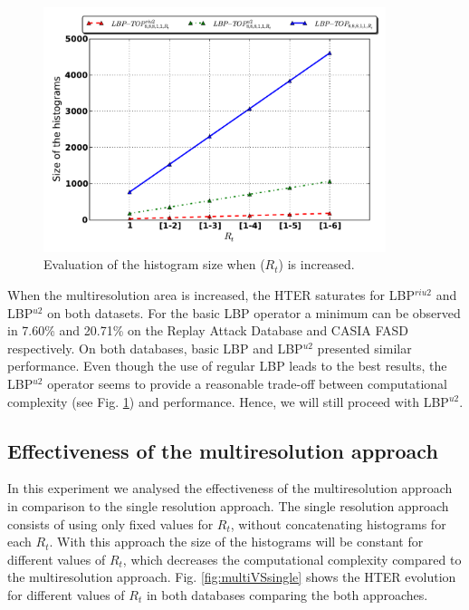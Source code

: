 \begin{figure}[!btb]
\begin{center}
\includegraphics [width=10cm] {images/proposed_countermeasure/dimIncrease.pdf}
\caption{Evaluation of the histogram size when ($R_t$) is increased.} 
\label{fig:dimIncrease}
\end{center}
\end{figure}

When the multiresolution area is increased, the HTER saturates for LBP$^{riu2}$ and LBP$^{u2}$ on both datasets. For the basic LBP operator a minimum can be observed in 7.60\% and 20.71\% on the Replay Attack Database and CASIA FASD respectively. On both databases, basic LBP and LBP$^{u2}$ presented similar performance. Even though the use of regular LBP leads to the best results, the LBP$^{u2}$ operator seems to provide a reasonable trade-off between computational complexity (see Fig. \ref{fig:dimIncrease}) and performance. Hence, we will still proceed with LBP$^{u2}$.

\subsection{Effectiveness of the multiresolution approach}
\label{sec_multiresolution}

In this experiment we analysed the effectiveness of the multiresolution approach in comparison to the single resolution approach. The single resolution approach consists of using only fixed values for $R_t$, without concatenating histograms for each $R_t$. With this approach the size of the histograms will be constant for different values of $R_t$, which decreases the computational complexity compared to the multiresolution approach. Fig. \ref{fig:multiVSsingle} shows the HTER evolution for different values of $R_t$ in both databases comparing the both approaches.


